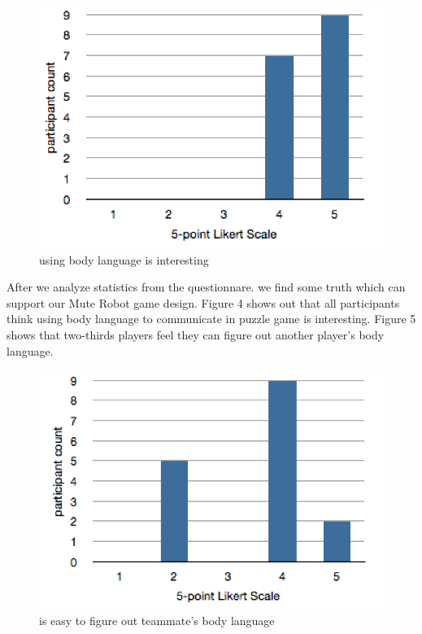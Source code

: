 \documentclass{chi-ext}
\begin{document}
\begin{figure}
  \centering
  \includegraphics[width=0.8\linewidth]{figures/1_BLisInteresting.png}
  \caption{using body language is interesting}
  \label{fig:1_BLisInteresting}
\end{figure}

After we analyze statistics from the questionnare. we find some truth which can support our Mute Robot game design. 
Figure 4 shows out that all participants think using body language to communicate in puzzle game is interesting.
Figure 5 shows that two-thirds players feel they can figure out another player's body language.


\begin{figure}
  \centering
  \includegraphics[width=0.9\linewidth]{figures/2_BLunderstand.png}
  \caption{is easy to figure out teammate's body language}
  \label{fig:2_BLunderstand}
\end{figure}

\end{document}
